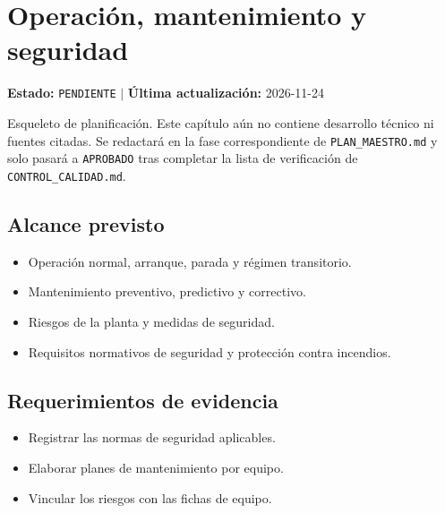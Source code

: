 \chapter{Operación, mantenimiento y seguridad}
\label{cap:13}

\begin{cajaestado}
\textbf{Estado:} \texttt{PENDIENTE} \quad$|$\quad
\textbf{Última actualización:} 2026-11-24

Esqueleto de planificación. Este capítulo aún no contiene desarrollo técnico ni
fuentes citadas. Se redactará en la fase correspondiente de
\texttt{PLAN\_MAESTRO.md} y solo pasará a \texttt{APROBADO} tras completar
la lista de verificación de \texttt{CONTROL\_CALIDAD.md}.
\end{cajaestado}

\section{Alcance previsto}
\begin{itemize}
  \item Operación normal, arranque, parada y régimen transitorio.
  \item Mantenimiento preventivo, predictivo y correctivo.
  \item Riesgos de la planta y medidas de seguridad.
  \item Requisitos normativos de seguridad y protección contra incendios.
\end{itemize}

\section{Requerimientos de evidencia}
\begin{itemize}
  \item Registrar las normas de seguridad aplicables.
  \item Elaborar planes de mantenimiento por equipo.
  \item Vincular los riesgos con las fichas de equipo.
\end{itemize}
